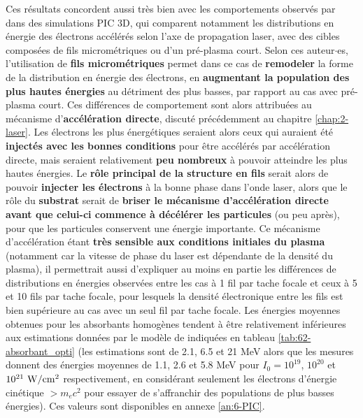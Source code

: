 \begin{refsection}
Ces résultats concordent aussi très bien avec les comportements observés par \cite{jiang_2014} dans des simulations PIC 3D, qui comparent notamment les distributions en énergie des électrons accélérés selon l'axe de propagation laser, avec des cibles composées de fils micrométriques ou d'un pré-plasma court. Selon ces auteur$\cdot$es, l'utilisation de \textbf{fils micrométriques} permet dans ce cas de \textbf{remodeler} la forme de la distribution en énergie des électrons, en \textbf{augmentant la population des plus hautes énergies} au détriment des plus basses, par rapport au cas avec pré-plasma court. Ces différences de comportement sont alors attribuées au mécanisme d'\textbf{accélération directe}, discuté précédemment au chapitre \ref{chap:2-laser}. Les électrons les plus énergétiques seraient alors ceux qui auraient été \textbf{injectés avec les bonnes conditions} pour être accélérés par accélération directe, mais seraient relativement \textbf{peu nombreux} à pouvoir atteindre les plus hautes énergies. Le \textbf{rôle principal de la structure en fils} serait alors de pouvoir \textbf{injecter les électrons} à la bonne phase dans l'onde laser, alors que le rôle du \textbf{substrat} serait de \textbf{briser le mécanisme d'accélération directe avant que celui-ci commence à décélérer les particules} (ou peu après), pour que les particules conservent une énergie importante. Ce mécanisme d'accélération étant \textbf{très sensible aux conditions initiales du plasma} (notamment car la vitesse de phase du laser est dépendante de la densité du plasma), il permettrait aussi d'expliquer au moins en partie les différences de distributions en énergies observées entre les cas à 1 fil par tache focale et ceux à 5 et 10 fils par tache focale, pour lesquels la densité électronique entre les fils est bien supérieure au cas avec un seul fil par tache focale. 
Les énergies moyennes obtenues pour les absorbants homogènes tendent à être relativement inférieures aux estimations données par le modèle de \cite{pazzaglia_2020} indiquées en tableau \ref{tab:62-absorbant_opti} (les estimations sont de 2.1, 6.5 et 21 MeV alors que les mesures donnent des énergies moyennes de 1.1, 2.6 et 5.8 MeV pour $I_0=10^{19}$, $10^{20}$ et $10^{21}  ~ \rm W/cm^2$ respectivement, en considérant seulement les électrons d'énergie cinétique $>m_e c^2$ pour essayer de s'affranchir des populations de plus basses énergies). Ces valeurs sont disponibles en annexe \ref{an:6-PIC}. 


\end{refsection}
